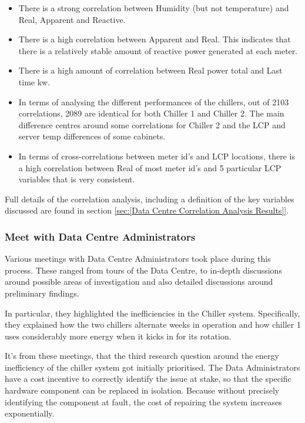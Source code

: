 \documentclass[12pt]{scrartcl}
\begin{document}
\begin{itemize}
\item There is a strong correlation between Humidity (but not temperature) and \gls{Real}, \Gls{Apparent} and \Gls{Reactive}.
\item There is a high correlation between \Gls{Apparent} and \Gls{Real}. This indicates that there is a relatively stable amount of reactive power generated at each meter.
\item There is a high amount of correlation between Real power total and Last time kw.
\item In terms of analysing the different performances of the chillers, out of 2103 correlations, 2089 are identical for both Chiller 1 and Chiller 2. The main difference centres around some correlations for Chiller 2 and the \gls{LCP} and server temp differences of some cabinets.
\item In terms of cross-correlations between meter id’s and LCP locations, there is a high correlation between \Gls{Real} of most meter id’s and 5 particular \gls{LCP} variables that is very consistent.
\end{itemize}  

Full details of the correlation analysis, including a definition of the key variables discussed are found in section \ref{sec:[Data Centre Correlation Analysis Results]}. 

\subsubsection{Meet with Data Centre Administrators}
\label{subsubsec:[Meet with Data Centre Administrators]}

Various meetings with Data Centre Administrators took place during this process. These ranged from tours of the Data Centre, to in-depth discussions around possible areas of investigation and also detailed discussions around preliminary findings. 

In particular, they highlighted the inefficiencies in the Chiller system. Specifically, they explained how the two chillers alternate weeks in operation and how chiller 1 uses considerably more energy when it kicks in for its rotation.

It's from these meetings, that the third research question around the energy inefficiency of the chiller system got initially prioritised. The Data Administrators have a cost incentive to correctly identify the issue at stake, so that the specific hardware component can be replaced in isolation. Because without precisely identifying the component at fault, the cost of repairing the system increases exponentially. 
\end{document}
